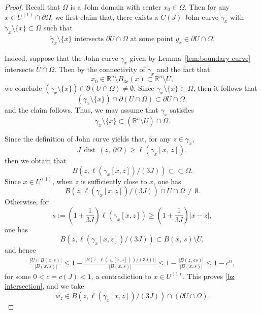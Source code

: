 \documentclass[reqno,11pt]{amsart}
\def\dist{{\mathop\mathrm{\,dist\,}}}
\def\gz{{\gamma}}
\numberwithin{equation}{section}
\theoremstyle{remark}
\begin{document}
\begin{proof}
\medskip 
Recall that $\Omega$ is a John domain with center $x_0\in \Omega$.  Then for any $x\in U^{(1)}\cap \partial \Omega$, we first claim that, there exists a $C(J)$-John curve $\widetilde\gz_x$ with $\tilde \gz_x\setminus\{x\}\subset \Omega$ such that
\begin{align}\label{claim:curve}
  \widetilde \gz_x\setminus\{x\}\text{ intersects $\partial U\cap \Omega$ at some point $y_x\in \partial U\cap \Omega$.}
\end{align}


Indeed, suppose that the John curve $\gamma_x$ given by Lemma~\ref{lem:boundary curve} 
intersects $\overline{U}\cap \Omega$. Then by the connectivity of $\gamma_x$ and the fact that
$$x_0\in \mathbb R^n \setminus B_{3r}(x)\subset \mathbb R^n\setminus U,$$ we conclude 
$(\gamma_x\setminus\{x\})\cap\partial(U\cap\Omega)\neq \emptyset.$
Since $\gamma_x\setminus\{x\}\subset \Omega$, then it follows that
$$(\gamma_x\setminus\{x\})\cap\partial(U\cap\Omega)\subset \partial U\cap \Omega,$$
and the claim follows. Thus, we may assume that   $\gamma
_x$ satisfies
$$\gamma_x\setminus \{x\}\subset (\mathbb R^n\setminus \overline{U})\cap \Omega.$$

Since the definition of John curve yields that, for any $z\in \gamma_x$, 
$$J\dist(z,\,\partial \Omega)\ge  \ell(\gamma_x[x,\,z]), $$
then we obtain that 
$$B(z,\ell(\gamma_x[x,z])/(3J))\subset\subset\Omega. $$
Since $x\in U^{(1)}$, when $z$ is sufficiently close to $x$, one has 
\begin{equation}\label{bz intersection}
    B(z,\ell(\gamma_x[x,z])/(3J))\cap U\cap \Omega\neq \emptyset.
\end{equation} 
Otherwise, for 
$$s:=\left(1+\frac{1}{3J}\right)\ell(\gamma_x[x,z]) \ge \left(1+\frac{1}{3J}\right) |x-z|,$$
one has
$$B(z,\ell(\gamma_x[x,z])/(3J))\subset B(x,\,s)\setminus U,$$
and hence
\begin{align*}
    \frac{|U\cap B(x,s)|}{|B(x,s)|}\le 1-\frac{|B(z,\, \ell(\gamma_x[x,z]))/(3J))|}{|B(x,s)|}\le 1-\frac{|B(z,\,cs)|}{|B(x,s)|}\le 1-c^n,
\end{align*}
for some $0<c=c(J)<1$, a contradiction to $x\in U^{(1)}$. This proves \eqref{bz intersection}, and we take 
$$w_z\in B(z,\ell(\gamma_x[x,z])/(3J))\cap (\partial U\cap \Omega).$$


\end{proof}
\end{document}
